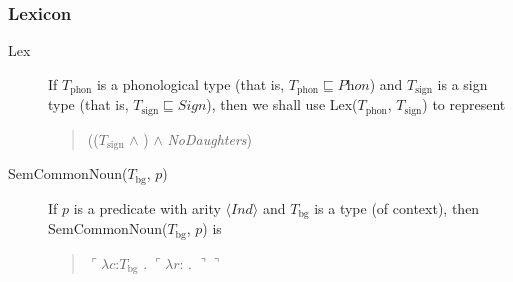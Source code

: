 \subsubsection{Lexicon} 
\begin{description}
\item[\textnormal{Lex}] \mbox{}

  If $T_{\mathrm{phon}}$ is a phonological type (that is,
$T_{\mathrm{phon}}\sqsubseteq\textit{Phon}$) and $T_{\mathrm{sign}}$
is a sign type (that is, $T_{\mathrm{sign}}\sqsubseteq\textit{Sign}$), then we shall use
Lex($T_{\mathrm{phon}}$, $T_{\mathrm{sign}}$) to represent
\begin{quote}
(($T_{\mathrm{sign}}$ \d{$\wedge$}
)
\d{$\wedge$} \textit{NoDaughters})
\end{quote}





\item[\textnormal{SemCommonNoun($T_{\mathrm{bg}}$, $p$)}]
  \mbox{}

    If $p$ is a predicate with arity $\langle\textit{Ind}\rangle$ and
    $T_{\mathrm{bg}}$ is a type (of context), then
    SemCommonNoun($T_{\mathrm{bg}}$, $p$) is
  \begin{quote}
    $\ulcorner\lambda c$:$T_{\mathrm{bg}}$ . $\ulcorner\lambda
r$:
. $\urcorner\urcorner$
\end{quote}


\end{description}
